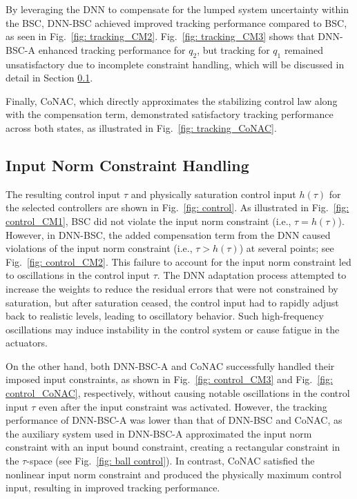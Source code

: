 \documentclass[lettersize,journal]{IEEEtran}
\begin{document}
By leveraging the DNN to compensate for the lumped system uncertainty within the BSC, DNN-BSC achieved improved tracking performance compared to BSC, as seen in Fig.~\ref{fig: tracking_CM2}. Fig.~\ref{fig: tracking_CM3} shows that DNN-BSC-A enhanced tracking performance for $q_2$, but tracking for $q_1$ remained unsatisfactory due to incomplete constraint handling, which will be discussed in detail in Section \ref{sec:sim_cnst}.

Finally, CoNAC, which directly approximates the stabilizing control law along with the compensation term, demonstrated satisfactory tracking performance across both states, as illustrated in Fig.~\ref{fig: tracking_CoNAC}.

\subsection{Input Norm Constraint Handling}\label{sec:sim_cnst}

The resulting control input $\tau$ and physically saturation control input $h(\tau)$ for the selected controllers are shown in Fig.~\ref{fig: control}. As illustrated in Fig.~\ref{fig: control_CM1}, BSC did not violate the input norm constraint (i.e., $\tau = h(\tau)$). However, in DNN-BSC, the added compensation term from the DNN caused violations of the input norm constraint (i.e., $\tau > h(\tau)$) at several points; see Fig.~\ref{fig: control_CM2}. This failure to account for the input norm constraint led to oscillations in the control input $\tau$. The DNN adaptation process attempted to increase the weights to reduce the residual errors that were not constrained by saturation, but after saturation ceased, the control input had to rapidly adjust back to realistic levels, leading to oscillatory behavior. Such high-frequency oscillations may induce instability in the control system or cause fatigue in the actuators.

On the other hand, both DNN-BSC-A and CoNAC successfully handled their imposed input constraints, as shown in Fig.~\ref{fig: control_CM3} and Fig.~\ref{fig: control_CoNAC}, respectively, without causing notable oscillations in the control input $\tau$ even after the input constraint was activated. However, the tracking performance of DNN-BSC-A was lower than that of DNN-BSC and CoNAC, as the auxiliary system used in DNN-BSC-A approximated the input norm constraint with an input bound constraint, creating a rectangular constraint in the $\tau$-space (see Fig.~\ref{fig: ball control}). In contrast, CoNAC satisfied the nonlinear input norm constraint and produced the physically maximum control input, resulting in improved tracking performance. 
\end{document}
